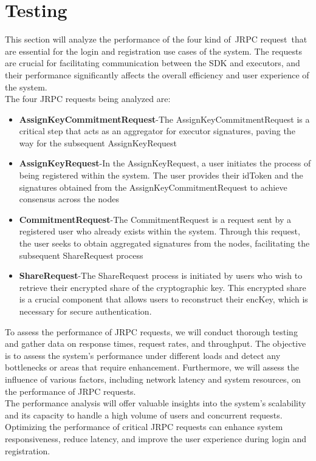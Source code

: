 \documentclass[../Main.tex]{subfiles}
\begin{document}
\section{Testing}
This section will analyze the performance of the four kind of JRPC request that are essential for the login and registration use cases of the system. The requests are crucial for facilitating communication between the SDK and executors, and their performance significantly affects the overall efficiency and user experience of the system.\\
\indent The four JRPC requests being analyzed are:
\begin{itemize}
  \item \textbf{AssignKeyCommitmentRequest}-The AssignKeyCommitmentRequest is a critical step that acts as an aggregator for executor signatures, paving the way for the subsequent AssignKeyRequest
  \item \textbf{AssignKeyRequest}-In the AssignKeyRequest, a user initiates the process of being registered within the system. The user provides their idToken and the signatures obtained from the AssignKeyCommitmentRequest to achieve consensus across the nodes
  \item \textbf{CommitmentRequest}-The CommitmentRequest is a request sent by a registered user who already exists within the system. Through this request, the user seeks to obtain aggregated signatures from the nodes, facilitating the subsequent ShareRequest process
  \item \textbf{ShareRequest}-The ShareRequest process is initiated by users who wish to retrieve their encrypted share of the cryptographic key. This encrypted share is a crucial component that allows users to reconstruct their encKey, which is necessary for secure authentication.
\end{itemize}
To assess the performance of JRPC requests, we will conduct thorough testing and gather data on response times, request rates, and throughput. The objective is to assess the system's performance under different loads and detect any bottlenecks or areas that require enhancement. Furthermore, we will assess the influence of various factors, including network latency and system resources, on the performance of JRPC requests.\\
\indent The performance analysis will offer valuable insights into the system's scalability and its capacity to handle a high volume of users and concurrent requests. Optimizing the performance of critical JRPC requests can enhance system responsiveness, reduce latency, and improve the user experience during login and registration.\\
\end{document}

